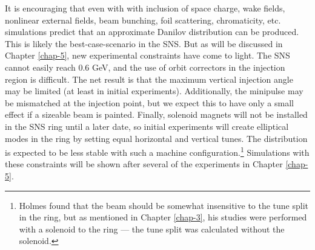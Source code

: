 It is encouraging that even with with inclusion of space charge, wake fields, nonlinear external fields, beam bunching, foil scattering, chromaticity, etc. simulations predict that an approximate Danilov distribution can be produced. This is likely the best-case-scenario in the SNS. But as will be discussed in Chapter \ref{chap-5}, new experimental constraints have come to light. The SNS cannot easily reach 0.6 GeV, and the use of orbit correctors in the injection region is difficult. The net result is that the maximum vertical injection angle may be limited (at least in initial experiments). Additionally, the minipulse may be mismatched at the injection point, but we expect this to have only a small effect if a sizeable beam is painted. Finally, solenoid magnets will not be installed in the SNS ring until a later date, so initial experiments will create elliptical modes in the ring by setting equal horizontal and vertical tunes. The distribution is expected to be less stable with such a machine configuration.\footnote{Holmes found that the beam should be somewhat insensitive to the tune split in the ring, but as mentioned in Chapter \ref{chap-3}, his studies were performed with a solenoid to the ring — the tune split was calculated without the solenoid.} Simulations with these constraints will be shown after several of the experiments in Chapter \ref{chap-5}.
